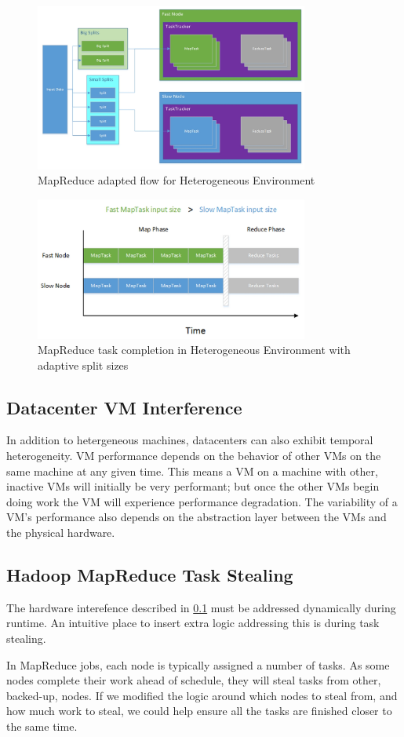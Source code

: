 \begin{figure}[ht!]
\centering
\includegraphics[width=90mm]{adaptive_mr.jpg}
\caption{MapReduce adapted flow for Heterogeneous Environment}
\label{fig:adaptive_mr}
\end{figure}

\begin{figure}[ht!]
\centering
\includegraphics[width=90mm]{adaptive_time.jpg}
\caption{MapReduce task completion in Heterogeneous Environment with adaptive split sizes}
\label{fig:adaptive_time}
\end{figure}

\subsection{Datacenter VM Interference}
\label{sec:interference}
In addition to hetergeneous machines, datacenters can also exhibit temporal heterogeneity.
VM performance depends on the behavior of other VMs on the same machine at any given time.
This means a VM on a machine with other, inactive VMs will initially be very performant;
but once the other VMs begin doing work the VM will experience performance degradation.
The variability of a VM's performance also depends on the abstraction layer between the VMs
and the physical hardware.

\subsection{Hadoop MapReduce Task Stealing}
The hardware interefence described in \ref{sec:interference} must be addressed dynamically
during runtime. An intuitive place to insert extra logic addressing this is during task
stealing.

In MapReduce jobs, each node is typically assigned a number of tasks. As some nodes
complete their work ahead of schedule, they will steal tasks from other, backed-up,
nodes. If we modified the logic around which nodes to steal from, and how much work
to steal, we could help ensure all the tasks are finished closer to the same time.

